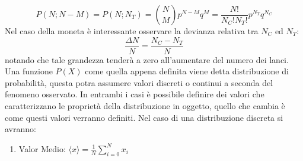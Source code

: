 $$P(N;N-M) = P(N; N_T) = \binom{N}{M} p^{N-M}q^M = \frac{N!}{N_C!N_T!}p^{N_T}q^{N_C}$$
Nel caso della moneta è interessante osservare la devianza relativa tra $N_C$ ed $N_T$:
$$\frac{\Delta N}{N} = \frac{N_C-N_T}{N}$$
notando che tale grandezza tenderà a zero all'aumentare del numero dei lanci.
\\Una funzione $P(X)$ come quella appena definita viene detta distribuzione di probabilità, questa potra assumere valori discreti o continui a seconda del fenomeno osservato. In entrambi i casi è possibile definire dei valori che caratterizzano le proprietà della distribuzione in oggetto, quello che cambia è come questi valori verranno definiti. Nel caso di una distribuzione discreta si avranno:
\begin{enumerate}
  \item Valor Medio: $\langle x \rangle = \frac{1}{N}\sum_{i=0}^Nx_i$
\end{enumerate}
